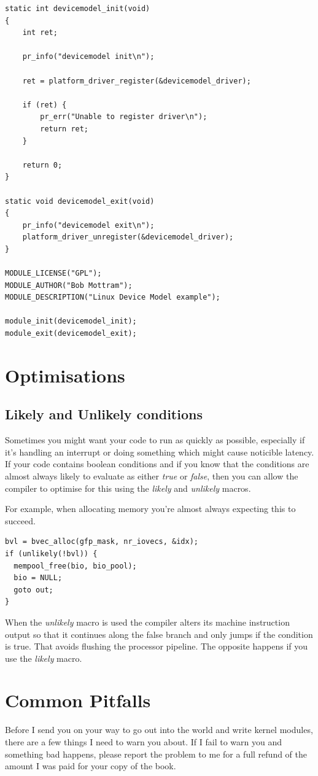 \documentclass[11pt]{article}
\begin{document}
\begin{verbatim}
static int devicemodel_init(void)
{
    int ret;

    pr_info("devicemodel init\n");

    ret = platform_driver_register(&devicemodel_driver);

    if (ret) {
        pr_err("Unable to register driver\n");
        return ret;
    }

    return 0;
}

static void devicemodel_exit(void)
{
    pr_info("devicemodel exit\n");
    platform_driver_unregister(&devicemodel_driver);
}

MODULE_LICENSE("GPL");
MODULE_AUTHOR("Bob Mottram");
MODULE_DESCRIPTION("Linux Device Model example");

module_init(devicemodel_init);
module_exit(devicemodel_exit);
\end{verbatim}
\section*{Optimisations}
\label{sec-18}
\subsection*{Likely and Unlikely conditions}
\label{sec-18-1}
Sometimes you might want your code to run as quickly as possible, especially if it's handling an interrupt or doing something which might cause noticible latency. If your code contains boolean conditions and if you know that the conditions are almost always likely to evaluate as either \emph{true} or \emph{false}, then you can allow the compiler to optimise for this using the \emph{likely} and \emph{unlikely} macros.

For example, when allocating memory you're almost always expecting this to succeed.

\begin{verbatim}
bvl = bvec_alloc(gfp_mask, nr_iovecs, &idx);
if (unlikely(!bvl)) {
  mempool_free(bio, bio_pool);
  bio = NULL;
  goto out;
}
\end{verbatim}

When the \emph{unlikely} macro is used the compiler alters its machine instruction output so that it continues along the false branch and only jumps if the condition is true. That avoids flushing the processor pipeline. The opposite happens if you use the \emph{likely} macro.
\section*{Common Pitfalls}
\label{sec-19}
Before I send you on your way to go out into the world and write kernel modules, there are a few things I need to warn you about. If I fail to warn you and something bad happens, please report the problem to me for a full refund of the amount I was paid for your copy of the book.
\end{document}
